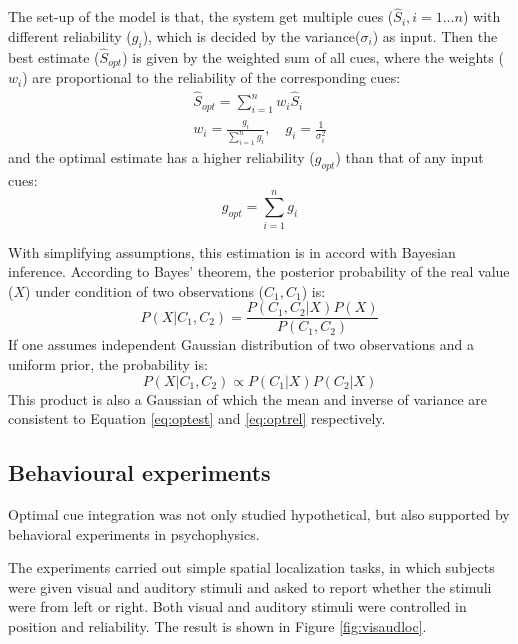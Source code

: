 \documentclass[12pt,twoside]{article}
\theoremstyle{plain}
\theoremstyle{definition}
\theoremstyle{remark}
\begin{document}
The set-up of the model is that, the system get multiple cues ($\hat{S}_i, i=1 \dots n$) with different reliability ($g_i$), which is decided by the variance($\sigma_i$) as input. Then the best estimate ($\hat{S}_{opt}$) is given by the weighted sum of all cues, where the weights ($w_i$) are proportional to the reliability of the corresponding cues:
\begin{gather}
  \hat{S}_{opt} = \sum_{i=1}^{n} w_i \hat{S}_i \label{eq:optest} \\
  w_i = \frac{g_i}{\sum_{i=1}^{n} g_i}, \quad g_i = \frac{1}{\sigma_i^2} \label{eq:optweight}
\end{gather}
and the optimal estimate has a higher reliability ($g_{opt}$) than that of any input cues:
\begin{equation}
  g_{opt} = \sum_{i=1}^{n} g_i \label{eq:optrel}
\end{equation}

With simplifying assumptions, this estimation is in accord with Bayesian inference\cite{knill_bayesian_2004}. According to Bayes' theorem, the posterior probability of the real value ($X$) under condition of two observations ($C_1, C_1$) is:
\begin{equation}
  P(X|C_1,C_2) = \frac{P(C_1,C_2|X)P(X)}{P(C_1,C_2)}
\end{equation}
If one assumes independent Gaussian distribution of two observations and a uniform prior, the probability is:
\begin{equation}
  P(X|C_1,C_2) \propto P(C_1|X)P(C_2|X)
\end{equation}
This product is also a Gaussian of which the mean and inverse of variance are consistent to Equation \ref{eq:optest} and \ref{eq:optrel} respectively.

\subsection{Behavioural experiments}
Optimal cue integration was not only studied hypothetical, but also supported by behavioral experiments in psychophysics\cite{alais_ventriloquist_2004}.

The experiments carried out simple spatial localization tasks, in which subjects were given visual and auditory stimuli and asked to report whether the stimuli were from left or right. Both visual and auditory stimuli were controlled in position and reliability. The result is shown in Figure \ref{fig:visaudloc}.
\end{document}

